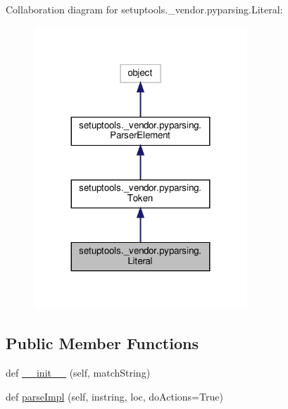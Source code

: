 Collaboration diagram for setuptools.\+\_\+vendor.\+pyparsing.\+Literal\+:
\nopagebreak
\begin{figure}[H]
\begin{center}
\leavevmode
\includegraphics[width=227pt]{classsetuptools_1_1__vendor_1_1pyparsing_1_1Literal__coll__graph}
\end{center}
\end{figure}
\subsection*{Public Member Functions}
\begin{DoxyCompactItemize}
\item 
def \hyperlink{classsetuptools_1_1__vendor_1_1pyparsing_1_1Literal_a47050614e2498973e643a07c14f6029b}{\+\_\+\+\_\+init\+\_\+\+\_\+} (self, match\+String)
\item 
def \hyperlink{classsetuptools_1_1__vendor_1_1pyparsing_1_1Literal_a0974a062784b366ec59e4e27d29d4af6}{parse\+Impl} (self, instring, loc, do\+Actions=True)
\end{DoxyCompactItemize}
